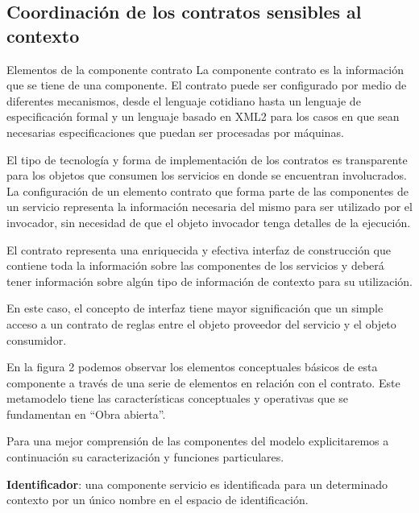 \subsection{Coordinación de los contratos sensibles al contexto}


Elementos de la componente contrato La componente contrato es la información que se tiene de una componente. El contrato puede ser configurado por medio de diferentes mecanismos, desde el lenguaje cotidiano hasta un lenguaje de especificación formal y un lenguaje basado en XML2 para los casos en que sean necesarias especificaciones que puedan ser procesadas por máquinas.

El tipo de tecnología y forma de implementación de los contratos es transparente para los objetos que consumen los servicios en donde se encuentran involucrados. La configuración de un elemento contrato que forma parte de las componentes de un servicio representa la información necesaria del mismo para ser utilizado por el invocador, sin necesidad de que el objeto invocador tenga
detalles de la ejecución.

El contrato representa una enriquecida y efectiva interfaz de construcción que contiene toda la información sobre las componentes de los servicios y deberá tener información sobre algún tipo de información de contexto para su utilización.

En este caso, el concepto de interfaz tiene mayor significación que un simple acceso a un contrato de reglas entre el objeto proveedor del servicio y el objeto consumidor.

En la figura 2 podemos observar los elementos conceptuales básicos de esta
componente a través de una serie de elementos en relación con el contrato.
Este metamodelo tiene las características conceptuales y operativas que se
fundamentan en “Obra abierta”.

Para una mejor comprensión de las componentes del modelo explicitaremos
a continuación su caracterización y funciones particulares.

\textbf{Identificador}: una componente servicio es identificada para un
determinado
contexto por un único nombre en el espacio de identificación.

